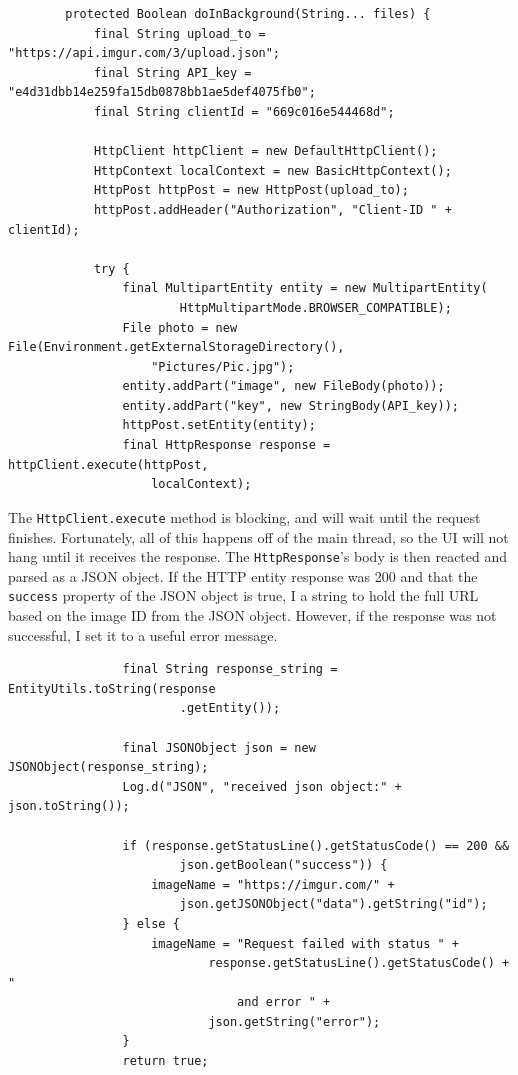 \documentclass[12pt]{article}
\begin{document}
\begin{verbatim}
        protected Boolean doInBackground(String... files) {
            final String upload_to = "https://api.imgur.com/3/upload.json";
            final String API_key = "e4d31dbb14e259fa15db0878bb1ae5def4075fb0";
            final String clientId = "669c016e544468d";

            HttpClient httpClient = new DefaultHttpClient();
            HttpContext localContext = new BasicHttpContext();
            HttpPost httpPost = new HttpPost(upload_to);
            httpPost.addHeader("Authorization", "Client-ID " + clientId);

            try {
                final MultipartEntity entity = new MultipartEntity(
                        HttpMultipartMode.BROWSER_COMPATIBLE);
                File photo = new File(Environment.getExternalStorageDirectory(),
                    "Pictures/Pic.jpg");
                entity.addPart("image", new FileBody(photo));
                entity.addPart("key", new StringBody(API_key));
                httpPost.setEntity(entity);
                final HttpResponse response = httpClient.execute(httpPost,
                    localContext);
\end{verbatim}

The \texttt{HttpClient.execute} method is blocking, and will wait until the request finishes. Fortunately, all of this happens off of the main thread, so the UI will not hang until it receives the response. The \texttt{HttpResponse}'s body is then reacted and parsed as a JSON object. If the HTTP entity response was 200 and that the \texttt{success} property of the JSON object is true, I a string to hold the full URL based on the image ID from the JSON object. However, if the response was not successful, I set it to a useful error message.


\begin{verbatim}
                final String response_string = EntityUtils.toString(response
                        .getEntity());

                final JSONObject json = new JSONObject(response_string);
                Log.d("JSON", "received json object:" + json.toString());

                if (response.getStatusLine().getStatusCode() == 200 &&
                        json.getBoolean("success")) {
                    imageName = "https://imgur.com/" +
                        json.getJSONObject("data").getString("id");
                } else {
                    imageName = "Request failed with status " +
                            response.getStatusLine().getStatusCode() + "
                                and error " +
                            json.getString("error");
                }
                return true;
\end{verbatim}
\end{document}
